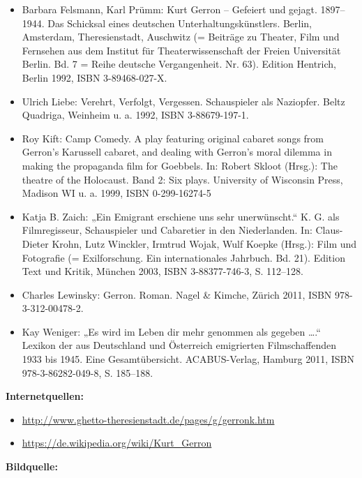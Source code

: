 \documentclass[a4paper]{article}
\begin{document}
\begin{itemize}
\item Barbara Felsmann, Karl Prümm: Kurt Gerron – Gefeiert und gejagt. 1897–1944. Das Schicksal eines deutschen
Unterhaltungskünstlers. Berlin, Amsterdam, Theresienstadt, Auschwitz (= Beiträge zu Theater, Film und Fernsehen aus dem
Institut für Theaterwissenschaft der Freien Universität Berlin. Bd. 7 = Reihe deutsche Vergangenheit. Nr. 63). Edition
Hentrich, Berlin 1992, ISBN 3-89468-027-X.  
\item Ulrich Liebe: Verehrt, Verfolgt, Vergessen. Schauspieler als Naziopfer. Beltz Quadriga, Weinheim u. a. 1992, ISBN
3-88679-197-1.  
\item Roy Kift: Camp Comedy. A play featuring original cabaret songs from Gerron’s Karussell cabaret, and dealing with
Gerron’s moral dilemma in making the propaganda film for Goebbels. In: Robert Skloot (Hrsg.): The theatre of the
Holocaust. Band 2: Six plays. University of Wisconsin Press, Madison WI u. a. 1999, ISBN 0-299-16274-5
\item Katja B. Zaich: „Ein Emigrant erschiene uns sehr unerwünscht.“ K. G. als Filmregisseur, Schauspieler und
Cabaretier in den Niederlanden. In: Claus-Dieter Krohn, Lutz Winckler, Irmtrud Wojak, Wulf Koepke (Hrsg.): Film und
Fotografie (= Exilforschung. Ein internationales Jahrbuch. Bd. 21). Edition Text und Kritik, München 2003, ISBN
3-88377-746-3, S. 112–128.  
\item Charles Lewinsky: Gerron. Roman. Nagel \& Kimche, Zürich 2011, ISBN 978-3-312-00478-2.  
\item Kay Weniger: „Es wird im Leben dir mehr genommen als gegeben ….“ Lexikon der aus Deutschland und Österreich
emigrierten Filmschaffenden 1933 bis 1945. Eine Gesamtübersicht. ACABUS-Verlag, Hamburg 2011, ISBN 978-3-86282-049-8,
S. 185–188.
\end{itemize}

\bigskip


\bigskip

\textbf{Internetquellen:}

\begin{itemize}
\item \url{http://www.ghetto-theresienstadt.de/pages/g/gerronk.htm} 
\item \url{https://de.wikipedia.org/wiki/Kurt_Gerron} 
\end{itemize}

\bigskip

\textbf{Bildquelle:}
\end{document}
